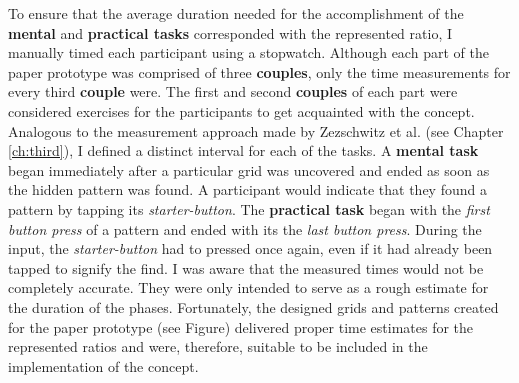 To ensure that the average duration needed for the accomplishment of the \textbf{mental} and \textbf{practical tasks} corresponded with the represented ratio, I manually timed each participant using a stopwatch. Although each part of the paper prototype was comprised of three \textbf{couples}, only the time measurements for every third \textbf{couple} were. The first and second \textbf{couples} of each part were considered exercises for the participants to get acquainted with the concept. \\
Analogous to the measurement approach made by Zezschwitz et al. \cite{Zezschwitz} (see Chapter \ref{ch:third}), I defined a distinct interval for each of the tasks. A \textbf{mental task} began immediately after a particular grid was uncovered and ended as soon as the hidden pattern was found. A participant would indicate that they found a pattern by tapping its \textit{starter-button}. The \textbf{practical task} began with the \textit{first button press} of a pattern and ended with its the \textit{last button press}. During the input, the \textit{starter-button} had to pressed once again, even if it had already been tapped to signify the find. I was aware that the measured times would not be completely accurate. They were only intended to serve as a rough estimate for the duration of the phases. Fortunately, the designed grids and patterns created for the paper prototype (see Figure) delivered proper time estimates for the represented ratios and were, therefore, suitable to be included in the implementation of the concept.\\

